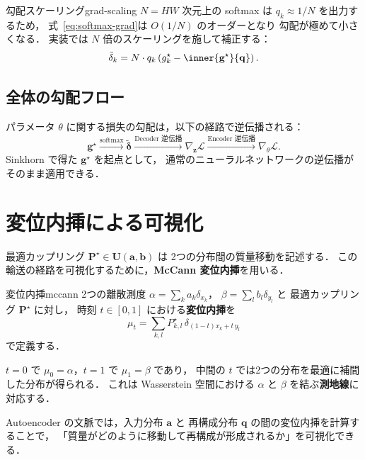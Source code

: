 \begin{remark}{勾配スケーリング}{grad-scaling}
$N = HW$ 次元上の softmax は $q_k \approx 1/N$ を出力するため，
式~\eqref{eq:softmax-grad}は $O(1/N)$ のオーダーとなり
勾配が極めて小さくなる．
実装では $N$ 倍のスケーリングを施して補正する：
\[
  \tilde{\delta}_k = N \cdot q_k \left( g^\star_k - \inner{\mathbf{g}^\star}{\mathbf{q}} \right).
\]
\end{remark}

\subsection{全体の勾配フロー}

パラメータ $\theta$ に関する損失の勾配は，以下の経路で逆伝播される：
\[
  \mathbf{g}^\star
  \xrightarrow{\text{softmax}}
  \tilde{\boldsymbol{\delta}}
  \xrightarrow{\text{Decoder 逆伝播}}
  \nabla_{\mathbf{z}} \mathcal{L}
  \xrightarrow{\text{Encoder 逆伝播}}
  \nabla_\theta \mathcal{L}.
\]
Sinkhorn で得た $\mathbf{g}^\star$ を起点として，
通常のニューラルネットワークの逆伝播がそのまま適用できる．


\section{変位内挿による可視化}\label{sec:interpolation}

最適カップリング $\mathbf{P}^\star \in \mathbf{U}(\mathbf{a}, \mathbf{b})$ は
2つの分布間の質量移動を記述する．
この輸送の経路を可視化するために，\textbf{McCann 変位内挿}を用いる．

\begin{definition}{変位内挿}{mccann}
2つの離散測度 $\alpha = \sum_k a_k \delta_{x_k}$，
$\beta = \sum_l b_l \delta_{y_l}$ と
最適カップリング $\mathbf{P}^\star$ に対し，
時刻 $t \in [0, 1]$ における\textbf{変位内挿}を
\begin{equation}\label{eq:mccann}
  \mu_t = \sum_{k,l} P^\star_{k,l}\, \delta_{(1-t)x_k + t\, y_l}
\end{equation}
で定義する．
\end{definition}

$t = 0$ で $\mu_0 = \alpha$，$t = 1$ で $\mu_1 = \beta$ であり，
中間の $t$ では2つの分布を最適に補間した分布が得られる．
これは Wasserstein 空間における
$\alpha$ と $\beta$ を結ぶ\textbf{測地線}に対応する．

Autoencoder の文脈では，入力分布 $\mathbf{a}$ と
再構成分布 $\mathbf{q}$ の間の変位内挿を計算することで，
「質量がどのように移動して再構成が形成されるか」を可視化できる．


